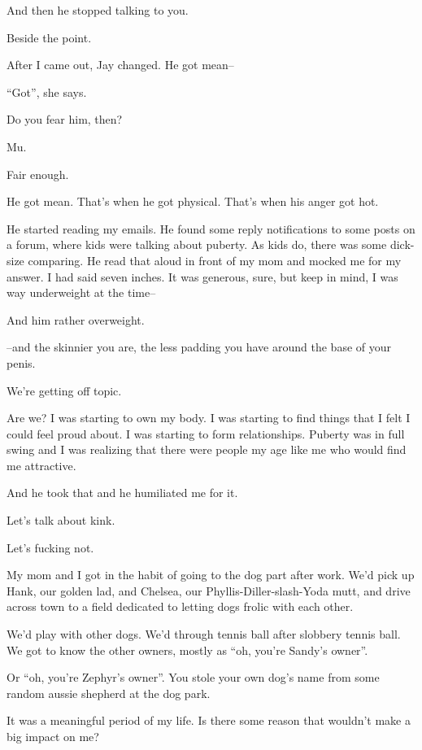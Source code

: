 \begin{ally}
And then he stopped talking to you.
\end{ally}
Beside the point.

After I came out, Jay changed. He got mean--

\begin{ally}
``Got'', she says.
\end{ally}
Do you fear him, then?

\begin{ally}
Mu.
\end{ally}
Fair enough.

He got mean. That's when he got physical. That's when his anger got hot.

He started reading my emails. He found some reply notifications to some posts on a forum, where kids were talking about puberty. As kids do, there was some dick-size comparing. He read that aloud in front of my mom and mocked me for my answer. I had said seven inches. It was generous, sure, but keep in mind, I was way underweight at the time--

\begin{ally}
And him rather overweight.
\end{ally}
--and the skinnier you are, the less padding you have around the base of your penis.

\begin{ally}
We're getting off topic.
\end{ally}
Are we? I was starting to own my body. I was starting to find things that I felt I could feel proud about. I was starting to form relationships. Puberty was in full swing and I was realizing that there were people my age like me who would find me attractive.

And he took that and he humiliated me for it.

\begin{ally}
Let's talk about kink.
\end{ally}
Let's fucking not.
\newpage

\noindent My mom and I got in the habit of going to the dog part after work. We'd pick up Hank, our golden lad, and Chelsea, our Phyllis-Diller-slash-Yoda mutt, and drive across town to a field dedicated to letting dogs frolic with each other.

We'd play with other dogs. We'd through tennis ball after slobbery tennis ball. We got to know the other owners, mostly as ``oh, you're Sandy's owner''.

\begin{ally}
Or ``oh, you're Zephyr's owner''. You stole your own dog's name from some random aussie shepherd at the dog park.
\end{ally}
It was a meaningful period of my life. Is there some reason that wouldn't make a big impact on me?

